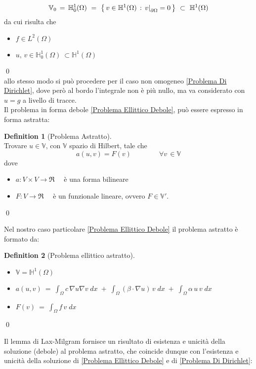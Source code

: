 \documentclass[12pt,a4paper]{report}
\theoremstyle{theorem}
\theoremstyle{definition}
\newtheorem{definition}{Definition}[section]
\newcommand\restr[2]{{%
  \left.\kern-\nulldelimiterspace %
  #1 %
  \right|_{#2} %
  }}
\begin{document}
\[  \mathbb{V}_{0} \, = \, \mathbb{H}_{0}^{1}(\Omega) \ = \ \left \{ \, v \in \mathbb{H}^{1}(\Omega) \, :  \, \restr{v}{\partial \Omega} = 0 \, \right \} \ \subset \  \mathbb{H}^1(\Omega) \]
da cui risulta che
\begin{itemize}
	\item $f \in L^{2}(\Omega)$
	\item $u, \, v \in \mathbb{H}_{0}^{1}(\Omega) \ \subset \mathbb{H}^{1}(\Omega)$
\end{itemize}
\qed
\hfill \\
allo stesso modo si può procedere per il caso non omogeneo \ref{Problema Di Dirichlet}, dove però al bordo l'integrale non è più nullo, ma va considerato con $u = g$ a livello di tracce.
\hfill \\
Il problema in forma debole \ref{Problema Ellittico Debole}, può essere espresso in forma astratta:
\begin{definition} [Problema Astratto]  \label{Problema Astratto}
\hfill \\
Trovare $u \in  \mathbb{V}$, con $\mathbb{V}$ spazio di Hilbert, tale che
\[ a(u,v) = F(v) \qquad \qquad \forall v \, \in \mathbb{V} \]
dove
\begin{itemize}
	\item $a: V \times V \rightarrow \Re \quad $ è una forma bilineare 
	\item $F: V \rightarrow \Re \quad $ è un funzionale lineare, ovvero $F \in \mathbb{V}'$.
\end{itemize}
\qed
\end{definition}
Nel nostro caso particolare \ref{Problema Ellittico Debole}  il problema astratto è formato da:
\begin{definition} [Problema ellittico astratto]  \label{Problema Ellittico Astratto}
\hfill \\
\begin{itemize}
	\item $\mathbb{V} = \mathbb{H}^1(\Omega)$
	\item $a(u,v) \ = \ \int_{\Omega}{c \, \nabla u \nabla v \; dx} \; + \; \int_{\Omega}{(\beta \cdot \nabla u) \, v \; dx} \; + \; \int_{\Omega}{\alpha \, u \, v \; dx}$
	\item $F(v) \ = \ \int_{\Omega}{f \, v \; dx}$
\end{itemize}
\qed
\end{definition}
Il lemma di Lax-Milgram fornisce un risultato di esistenza e unicità della soluzione (debole) al problema astratto, che coincide dunque con l'esistenza e unicità della soluzione di \ref{Problema Ellittico Debole} e di \ref{Problema Di Dirichlet}:
\end{document}
